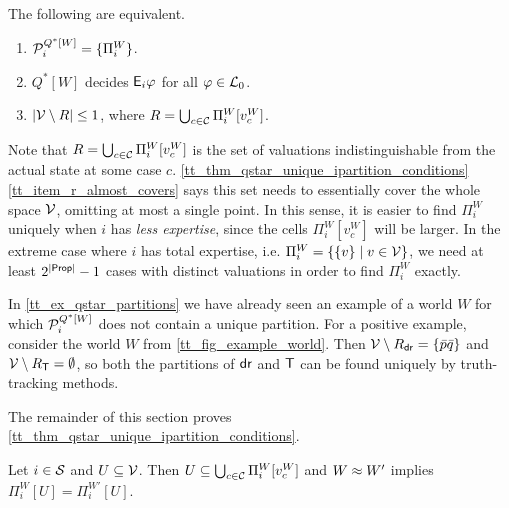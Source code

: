 \begin{theorem}
    \label{tt_thm_qstar_unique_ipartition_conditions}
    The following are equivalent.
    \begin{enumerate}
        \item\label{tt_item_uniquepart} $\mathcal{P}^{Q^*[W]}_i = \{\Pi^W_i\}$.
        \item\label{tt_item_define_all_ephi} $Q^*[W]$ decides $\mathsf{E}_i\varphi$ for all
            $\varphi \in \mathcal{L}_0$.
        \item\label{tt_item_r_almost_covers} $|\mathcal{V} \setminus R| \le 1$, where $R
            = \bigcup_{c \in \mathcal{C}}{\Pi^W_i[v^W_c]}$.
    \end{enumerate}
\end{theorem}

Note that $R = \bigcup_{c \in \mathcal{C}}{\Pi^W_i[v^W_c]}$ is the set of valuations
indistinguishable from the actual state at some case $c$.
\cref{tt_thm_qstar_unique_ipartition_conditions} \cref{tt_item_r_almost_covers} says
this set needs to essentially cover the whole space $\mathcal{V}$, omitting at most a
single point. In this sense, it is easier to find $\Pi^W_i$ uniquely when $i$
has \emph{less expertise}, since the cells $\Pi^W_i[v^W_c]$ will be larger. In
the extreme case where $i$ has total expertise, i.e. $\Pi^W_i = \{\{v\} \mid v
\in \mathcal{V}\}$, we need at least $2^{|\mathsf{Prop}|} - 1$ cases with distinct
valuations in order to find $\Pi^W_i$ exactly.

\begin{example}
    \label{tt_ex_qstar_unique_ipartition_conditions}
    In \cref{tt_ex_qstar_partitions} we have already seen an example of a world
    $W$ for which $\mathcal{P}^{Q^*[W]}_i$ does not contain a unique partition.
    For a positive example, consider the world $W$ from
    \cref{tt_fig_example_world}. Then $\mathcal{V} \setminus R_{\mathsf{dr}{}} =
    \{\bar{p}\bar{q}\}$ and $\mathcal{V} \setminus R_{\mathsf{T}{}} = \emptyset$, so both
    the partitions of $\mathsf{dr}{}$ and $\mathsf{T}{}$ can be found uniquely by
    truth-tracking methods.
\end{example}

The remainder of this section proves
\cref{tt_thm_qstar_unique_ipartition_conditions}.

\begin{lemma}
    \label{tt_lemma_u_expansion_equal}
    Let $i \in \mathcal{S}$ and $U \subseteq \mathcal{V}$. Then $U \subseteq \bigcup_{c \in
    \mathcal{C}}{\Pi^W_i[v^W_c]}$ and $W \approx W'$ implies $\Pi^W_i[U] =
    \Pi^{W'}_i[U]$.
\end{lemma}

